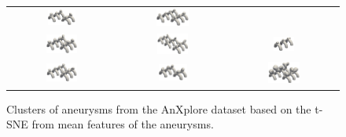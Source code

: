 \documentclass[%
 reprint,
 amsmath,amssymb,
 aps,
 floatfix,
 nofootinbib,
]{revtex4-2}
\begin{document}
\begin{figure}[h!]
\begin{center}
\begin{tabular}{ccc}
    \includegraphics[width=0.269\textwidth]{cluster_7.png} &
    \includegraphics[width=0.319\textwidth]{cluster_8.png} \\
    \includegraphics[width=0.310\textwidth]{cluster_9.png} &
    \includegraphics[width=0.310\textwidth]{cluster_10.png} &
    \includegraphics[width=0.205\textwidth]{cluster_11.png} \\
    \includegraphics[width=0.314\textwidth]{cluster_12.png} &
    \includegraphics[width=0.283\textwidth]{cluster_13.png} &
    \includegraphics[width=0.314\textwidth]{cluster_14.png} \\
\end{tabular}
\end{center}
\caption{Clusters of aneurysms from the AnXplore dataset \citep{anxplore} based on the t-SNE from mean features of the aneurysms.}
  \label{fig:clustering_supplementary}
\end{figure}
\end{document}
